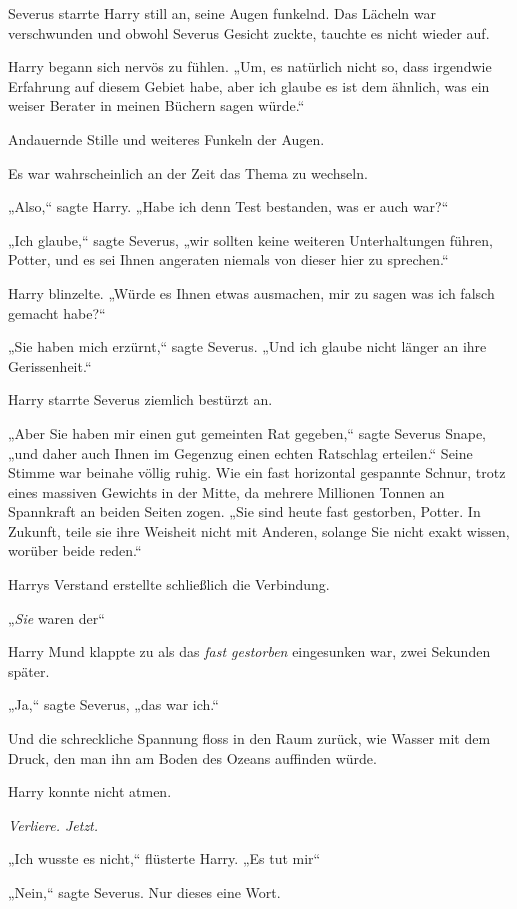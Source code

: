 {Severus starrte Harry still an, seine Augen funkelnd. Das Lächeln war verschwunden und obwohl Severus Gesicht zuckte, tauchte es nicht wieder auf.

Harry begann sich nervös zu fühlen. „Um, es natürlich nicht so, dass irgendwie Erfahrung auf diesem Gebiet habe, aber ich glaube es ist dem ähnlich, was ein weiser Berater in meinen Büchern sagen würde.“

Andauernde Stille und weiteres Funkeln der Augen.

Es war wahrscheinlich an der Zeit das Thema zu wechseln.

„Also,“ sagte Harry. „Habe ich denn Test bestanden, was er auch war?“

„Ich glaube,“ sagte Severus, „wir sollten keine weiteren Unterhaltungen führen, Potter, und es sei Ihnen angeraten niemals von dieser hier zu sprechen.“

Harry blinzelte. „Würde es Ihnen etwas ausmachen, mir zu sagen was ich falsch gemacht habe?“

„Sie haben mich erzürnt,“ sagte Severus. „Und ich glaube nicht länger an ihre Gerissenheit.“

Harry starrte Severus ziemlich bestürzt an.

„Aber Sie haben mir einen gut gemeinten Rat gegeben,“ sagte Severus Snape, „und daher auch Ihnen im Gegenzug einen echten Ratschlag erteilen.“ Seine Stimme war beinahe völlig ruhig. Wie ein fast horizontal gespannte Schnur, trotz eines massiven Gewichts in der Mitte, da mehrere Millionen Tonnen an Spannkraft an beiden Seiten zogen. „Sie sind heute fast gestorben, Potter. In Zukunft, teile sie ihre Weisheit nicht mit Anderen, solange Sie nicht exakt wissen, worüber beide reden.“

Harrys Verstand erstellte schließlich die Verbindung.

„\emph{Sie} waren der\later“

Harry Mund klappte zu als das \emph{fast gestorben} eingesunken war, zwei Sekunden später.

„Ja,“ sagte Severus, „das war ich.“

Und die schreckliche Spannung floss in den Raum zurück, wie Wasser mit dem Druck, den man ihn am Boden des Ozeans auffinden würde.

Harry konnte nicht atmen.

\emph{Verliere. Jetzt.}

„Ich wusste es nicht,“ flüsterte Harry. „Es tut mir\later“

„Nein,“ sagte Severus. Nur dieses eine Wort.

}
